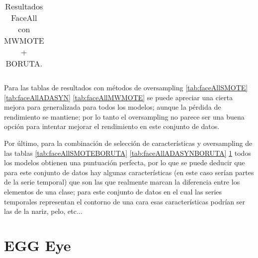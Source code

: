 \begin{table}[h]
\begin{adjustbox}{max width=11cm}
\begin{tabular}{|c|l|r|r|r|r|r|r|r|r|r|r|r|}
\end{tabular}
\end{adjustbox}	
\caption{Resultados FaceAll con MWMOTE + BORUTA.}
\label{tab:faceAllMWMOTEBORUTA}
\end{table}

\newpage



Para las tablas de resultados con métodos de oversampling \ref{tab:faceAllSMOTE} \ref{tab:faceAllADASYN} \ref{tab:faceAllMWMOTE} se puede apreciar una cierta mejora para generalizada para todos los modelos; aunque la pérdida de rendimiento se mantiene; por lo tanto el oversampling no parece ser una buena opción para intentar mejorar el rendimiento en este conjunto de datos.

Por último, para la combinación de selección de características y oversampling de las tablas \ref{tab:faceAllSMOTEBORUTA} \ref{tab:faceAllADASYNBORUTA} \ref{tab:faceAllMWMOTEBORUTA} todos los modelos obtienen una puntuación perfecta, por lo que se puede deducir que para este conjunto de datos hay algunas características (en este caso serían partes de la serie temporal) que son las que realmente marcan la diferencia entre los elementos de una clase; para este conjunto de datos en el cual las series temporales representan el contorno de una cara esas características podrían ser las de la nariz, pelo, etc...

\newpage 
\section{EGG Eye}

